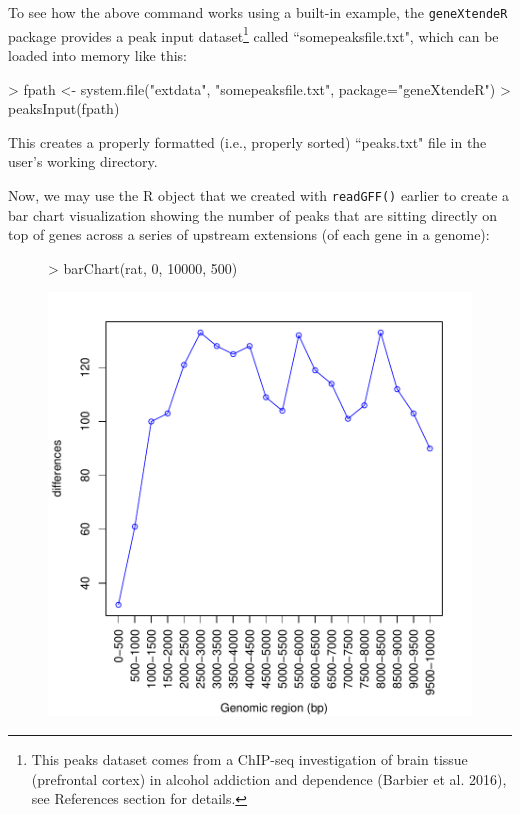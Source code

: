 \documentclass[12pt]{article}
\begin{document}
To see how the above command works using a built-in example, the \texttt{geneXtendeR} package provides a peak input dataset\footnote{This peaks dataset comes from a ChIP-seq investigation of brain tissue (prefrontal cortex) in alcohol addiction and dependence (Barbier et al. 2016), see References section for details.} called ``somepeaksfile.txt", which can be loaded into memory like this:

\begin{Schunk}
\begin{Sinput}
> fpath <- system.file("extdata", "somepeaksfile.txt", package="geneXtendeR")
> peaksInput(fpath)
\end{Sinput}
\end{Schunk}

This creates a properly formatted (i.e., properly sorted) ``peaks.txt" file in the user's working directory.

Now, we may use the R object that we created with \texttt{readGFF()} earlier to create a bar chart visualization showing the number of peaks that are sitting directly on top of genes across a series of upstream extensions (of each gene in a genome):

\begin{figure}[H]
\begin{center}
\begin{Schunk}
\begin{Sinput}
> barChart(rat, 0, 10000, 500)
\end{Sinput}
\end{Schunk}
\includegraphics{geneXtendeR-007}
\end{center}
\end{figure}
\end{document}
